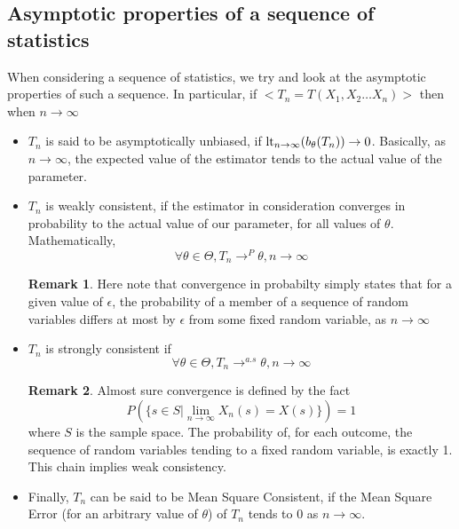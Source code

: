 \documentclass[12pt]{book}
\theoremstyle{definition}
\newtheorem*{remark}{Remark}
\begin{document}
\subsection{Asymptotic properties of a sequence of statistics}
When considering a sequence of statistics, we try and look at the asymptotic properties of such a sequence. In particular, if $<T_n = T(X_1,X_2\ldots X_n)>$ then when $n \to \infty$ \begin{itemize}
    \item $T_n$ is said to be asymptotically unbiased, if $\textnormal{lt}_{n \to \infty} (b_{\theta}(T_n)) \to 0$. Basically, as $n \to \infty$, the expected value of the estimator tends to the actual value of the parameter.
    \item $T_n$ is weakly consistent, if the estimator in consideration converges in probability to the actual value of our parameter, for all values of $\theta$. Mathematically, $$\forall \theta \in \Theta, T_n \to^P \theta, n \to \infty$$ \begin{remark}
        Here note that convergence in probabilty simply states that for a given value of $\epsilon$, the probability of a member of a sequence of random variables differs at most by $\epsilon$ from some fixed random variable, as $n \to \infty$
    \end{remark}
    \item $T_n$ is strongly consistent if $$\forall \theta \in \Theta, T_n \to^{a.s} \theta, n \to \infty$$ \begin{remark}
        Almost sure convergence is defined by the fact $$P(\{s \in S | \lim_{n \to \infty} X_n(s) = X(s)\}) = 1$$ where $S$ is the sample space. The probability of, for each outcome, the sequence of random variables tending to a fixed random variable, is exactly 1. This chain implies weak consistency.  
    \end{remark}
    \item Finally, $T_n$ can be said to be Mean Square Consistent, if the Mean Square Error (for an arbitrary value of $\theta$) of $T_n$ tends to 0 as $n \to \infty$.
\end{itemize}
\end{document}
